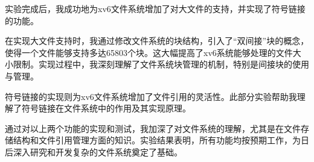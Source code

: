 实验完成后，我成功地为xv6文件系统增加了对大文件的支持，并实现了符号链接的功能。

在实现大文件支持时，我通过修改文件系统的块结构，引入了“双间接”块的概念，使得一个文件能够支持多达65803个块。这大幅提高了xv6系统能够处理的文件大小限制。实现过程中，我深刻理解了文件系统块管理的机制，特别是间接块的使用与管理。

符号链接的实现则为xv6文件系统增加了文件引用的灵活性。此部分实验帮助我理解了符号链接在文件系统中的作用及其实现原理。

通过对以上两个功能的实现和测试，我加深了对文件系统的理解，尤其是在文件存储结构和文件引用管理方面的知识。实验结果表明，所有功能均按预期工作，为日后深入研究和开发复杂的文件系统奠定了基础。